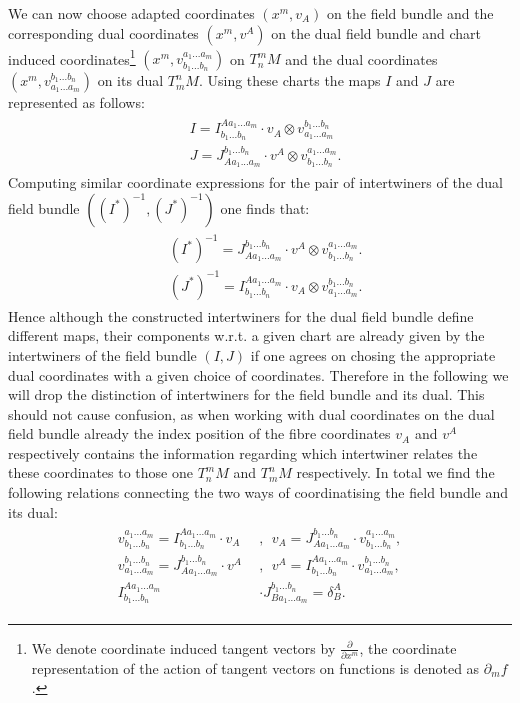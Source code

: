 \documentclass[a4paper,12pt, DIV=14, BCOR=5mm, twoside, headsepline]{scrbook}
\begin{document}
We can now choose adapted coordinates $(x^m,v_A)$ on the field bundle and the corresponding dual coordinates $(x^m, v^A)$ on the dual field bundle and chart induced coordinates\footnote{We denote coordinate induced tangent vectors by $\frac{\partial}{\partial x^m}$, the coordinate representation of the action of tangent vectors on functions is denoted as $\partial_m f$. } $(x^m, v^{a_1 ... a_m}_{b_1 ... b_n})$ on $T^m_n M$ and the dual coordinates $(x^m, v^{b_1 ... b_n}_{a_1 ... a_m})$ on its dual $T^n_mM$. Using these charts the maps $I$ and $J$ are represented as follows:
\begin{align} \label{interAbs}
    \begin{aligned}
    &I = I^{A a_1 ... a_m}_{b_1 ... b_n} \cdot v_A \otimes  v^{b_1 ... b_n}_{a_1 ... a_m}\\
    &J = J^{b_1 ... b_n}_{A a_1 ... a_m} \cdot v^A \otimes  v^{a_1 ... a_m}_{b_1 ... b_n}.
    \end{aligned}
\end{align}
Computing similar coordinate expressions for the pair of intertwiners of the dual field bundle $((I^{\ast})^{-1}, (J^{\ast})^{-1})$ one finds that:
\begin{align} \label{dualInterAbs}
    \begin{aligned}
         &(I^{\ast})^{-1} = J^{b_1 ... b_n}_{A a_1 ... a_m} \cdot v^A \otimes  v^{a_1 ... a_m}_{b_1 ... b_n}.\\
         &(J^{\ast})^{-1} = I^{A a_1 ... a_m}_{b_1 ... b_n} \cdot v_A \otimes  v^{b_1 ... b_n}_{a_1 ... a_m}.
    \end{aligned}
\end{align} 
Hence although the constructed intertwiners for the dual field bundle define different maps, their components w.r.t. a given chart are already given by the intertwiners of the field bundle $(I,J)$ if one agrees on chosing the appropriate dual coordinates with a given choice of coordinates. Therefore in the following we will drop the distinction of intertwiners for the field bundle and its dual.  This should not cause confusion, as when working with dual coordinates on the dual field bundle already the index position of the fibre coordinates $v_A$ and $v^{A}$ respectively contains the information regarding which intertwiner relates the these coordinates to those one $T^m_n M$ and $T^n_mM$ respectively. In total we find the following relations connecting the two ways of coordinatising the field bundle and its dual:  
\begin{align} \label{interRel}
    \begin{aligned}
    v^{a_1 ... a_m}_{b_1 ... b_n} = I^{A a_1 ... a_m}_{b_1 ... b_n} \cdot v_{A} \ \ &, \ \  
    v_A = J^{b_1 ... b_n}_{A a_1 ... a_m} \cdot v^{a_1 ... a_m}_{b_1 ... b_n}, \\
    v^{b_1 ... b_n}_{a_1 ... a_m} = J^{b_1 ... b_n}_{A a_1 ... a_m} \cdot v^A \ \ &, \ \ 
    v^A = I^{A a_1 ... a_m}_{b_1 ... b_n} \cdot v^{b_1 ... b_n}_{a_1 ... a_m}, \\
    I^{A a_1 ... a_m}_{b_1 ... b_n} &\cdot J^{b_1 ... b_n}_{B a_1 ... a_m} = \delta^A _ B.
    \end{aligned}
\end{align}
\end{document}
